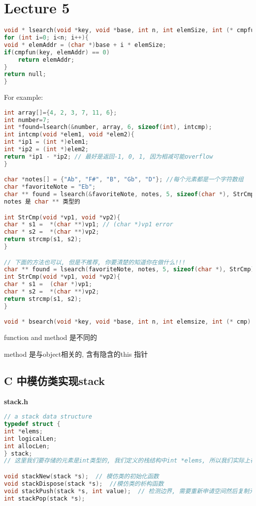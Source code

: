 \documentclass{article}
\begin{document}
\section{Lecture 5}
\begin{lstlisting}[language = C]
void * lsearch(void *key, void *base, int n, int elemSize, int (* cmpfun)(void *, void *)){
for (int i=0; i<n; i++){
void * elemAddr = (char *)base + i * elemSize;	
if(cmpfun(key, elemAddr) == 0)
	return elemAddr;
}
return null;
}
\end{lstlisting}
For example:
\begin{lstlisting}[language = C]
int array[]={4, 2, 3, 7, 11, 6};
int number=7;
int *found=lsearch(&number, array, 6, sizeof(int), intcmp);
int intcmp(void *elem1, void *elem2){
int *ip1 = (int *)elem1;
int *ip2 = (int *)elem2;
return *ip1 - *ip2; // 最好是返回-1, 0, 1, 因为相减可能overflow
}

char *notes[] = {"Ab", "F#", "B", "Gb", "D"}; //每个元素都是一个字符数组
char *favoriteNote = "Eb";
char ** found = lsearch(&favoriteNote, notes, 5, sizeof(char *), StrCmp);
notes 是 char ** 类型的

int StrCmp(void *vp1, void *vp2){
char * s1 =  *(char **)vp1; // (char *)vp1 error
char * s2 =  *(char **)vp2;
return strcmp(s1, s2);
}

// 下面的方法也可以, 但是不推荐, 你要清楚的知道你在做什么!!!
char ** found = lsearch(favoriteNote, notes, 5, sizeof(char *), StrCmp);
int StrCmp(void *vp1, void *vp2){
char * s1 =  (char *)vp1;
char * s2 =  *(char **)vp2;
return strcmp(s1, s2);
}

void * bsearch(void *key, void *base, int n, int elemsize, int (* cmp)(void *, void *))
\end{lstlisting}

function and method 是不同的

method 是与object相关的, 含有隐含的this 指针

\subsection{C 中模仿类实现stack}
\textbf{stack.h}
\begin{lstlisting}[language = C]
// a stack data structure
typedef struct {
int *elems;
int logicalLen;
int allocLen;
} stack;
// 这里我们要存储的元素是int类型的, 我们定义的栈结构中int *elems, 所以我们实际上在栈中存储的是我们想要存储东西的指针, 在这里, 也就是说栈中的元素是int *类型的

void stackNew(stack *s);  // 模仿类的初始化函数
void stackDispose(stack *s);  //模仿类的析构函数
void stackPush(stack *s, int value);  // 检测边界, 需要重新申请空间然后复制元素后再添加
int stackPop(stack *s);
\end{lstlisting}
\end{document}
